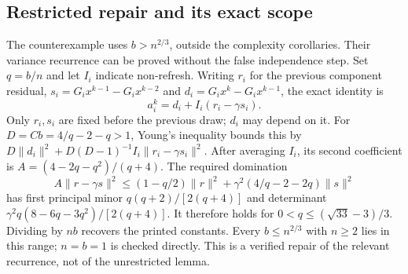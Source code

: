 \documentclass[10pt]{article}
\begin{document}
\subsection*{Restricted repair and its exact scope}
The counterexample uses \(b>n^{2/3}\), outside the complexity corollaries. Their variance recurrence can be proved without the false independence step. Set \(q=b/n\) and let \(I_i\) indicate non-refresh. Writing \(r_i\) for the previous component residual, \(s_i=G_ix^{k-1}-G_ix^{k-2}\) and \(d_i=G_ix^k-G_ix^{k-1}\), the exact identity is \[a_i^k=d_i+I_i(r_i-\gamma s_i).\] Only \(r_i,s_i\) are fixed before the previous draw; \(d_i\) may depend on it. For \(D=Cb=4/q-2-q>1\), Young’s inequality bounds this by \(D\|d_i\|^2+D(D-1)^{-1}I_i\|r_i-\gamma s_i\|^2\). After averaging \(I_i\), its second coefficient is \(A=(4-2q-q^2)/(q+4)\). The required domination \[A\|r-\gamma s\|^2
 \le(1-q/2)\|r\|^2+\gamma^2(4/q-2-2q)\|s\|^2\] has first principal minor \(q(q+2)/[2(q+4)]\) and determinant \(\gamma^2q(8-6q-3q^2)/[2(q+4)]\). It therefore holds for \(0<q\le(\sqrt{33}-3)/3\). Dividing by \(nb\) recovers the printed constants. Every \(b\le n^{2/3}\) with \(n\ge2\) lies in this range; \(n=b=1\) is checked directly. This is a verified repair of the relevant recurrence, not of the unrestricted lemma.\par
\end{document}
